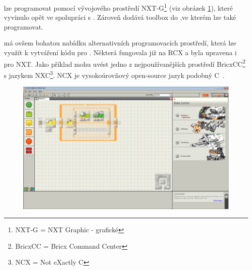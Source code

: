 \brick{ }lze programovat pomocí vývojového prostředí NXT-G\footnote{NXT-G = NXT Graphic - grafické} (viz obrázek \ref{fig:lego-mindstorms-nxt-g}), které \lego{ }vyvinulo opět ve spolupráci s  \NI{~}\cite{legoMindstormsNXT_NXT-G}. 
Zároveň \NI{ }dodává toolbox do \labview{ },ve kterém lze \brick{ }také programovat. 
% 
% 
% 
%
%

\legoNXT{ }má ovšem bohatou nabídku alternativních programovacích prostředí, která lze využít k vytváření kódu pro \brick. 
% 
% 
% 
%
%
Některá fungovala již na RCX a byla upravena i pro NXT. 
% 
% 
% 
%
%
%
%
Jako příklad mohu uvést jedno z nejpoužívanějších prostředí BricxCC\footnote{BricxCC = Bricx Command Center} s jazykem NXC\footnote{NCX = Not eXactly C}. 
NCX je vysokoúrovňový open-source jazyk podobný C~\cite{legoWikipediaNXT_NXC}.

\begin{figure}[h]
	\centering
	\includegraphics[width=\textwidth]{images/lego-mindstorms-nxt-g.png}
	\caption[]{\protect\footnotemark}
	\label{fig:lego-mindstorms-nxt-g}
\end{figure}

